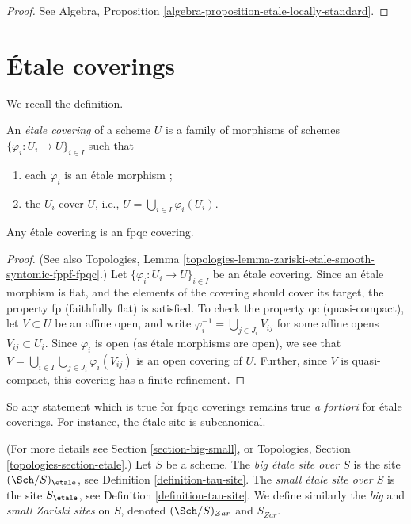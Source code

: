 \begin{proof}
See
Algebra, Proposition \ref{algebra-proposition-etale-locally-standard}.
\end{proof}





\section{\'Etale coverings}
\label{section-etale-covering}

\noindent
We recall the definition.

\begin{definition}
\label{definition-etale-covering}
An {\it \'etale covering} of a scheme $U$ is a family of morphisms
of schemes
$\{\varphi_i : U_i \to U\}_{i \in I}$ such that
\begin{enumerate}
\item each $\varphi_i$ is an \'etale morphism ;
\item the $U_i$ cover $U$, i.e., $U = \bigcup_{i\in I}\varphi_i(U_i)$.
\end{enumerate}
\end{definition}

\begin{lemma}
\label{lemma-etale-fpqc}
Any \'etale covering is an fpqc covering.
\end{lemma}

\begin{proof}
(See also
Topologies,
Lemma \ref{topologies-lemma-zariski-etale-smooth-syntomic-fppf-fpqc}.)
Let $\{\varphi_i : U_i \to U\}_{i \in I}$ be an \'etale covering.
Since an \'etale morphism is flat, and the elements of the covering should
cover its target, the property fp (faithfully flat) is satisfied.
To check the property qc (quasi-compact), let $V \subset U$ be an affine
open, and write $\varphi_i^{-1} = \bigcup_{j \in J_i} V_{ij}$
for some affine opens $V_{ij} \subset U_i$. Since $\varphi_i$ is open
(as \'etale morphisms are open), we see that
$V = \bigcup_{i\in I} \bigcup_{j \in J_i} \varphi_i(V_{ij})$
is an open covering of $U$.
Further, since $V$ is quasi-compact, this covering has a finite
refinement.
\end{proof}

\noindent
So any statement which is true for fpqc coverings
remains true {\it a fortiori} for \'etale coverings. For
instance, the \'etale site is subcanonical.

\begin{definition}
\label{definition-big-etale-site}
(For more details see Section \ref{section-big-small}, or
Topologies, Section \ref{topologies-section-etale}.)
Let $S$ be a scheme.
The {\it big \'etale site over $S$} is the site
$(\Sch/S)_\etale$, see
Definition \ref{definition-tau-site}.
The {\it small \'etale site over $S$} is the site $S_\etale$, see
Definition \ref{definition-tau-site}.
We define similarly the {\it big} and {\it small Zariski sites} on $S$,
denoted $(\Sch/S)_{Zar}$ and $S_{Zar}$.
\end{definition}

